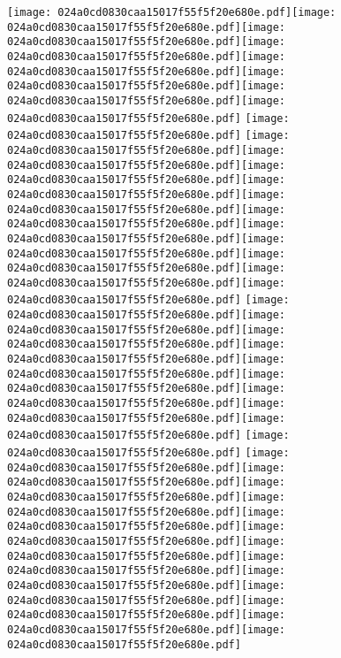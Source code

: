 \documentclass{article}
\newcommand{\origpg}[2]{\texttt{[image: 024a0cd0830caa15017f55f5f20e680e.pdf]}}
\begin{document}
{\vspace{20.015pt}\origpg{13}{85.303pt 625.79pt 93.373pt 641.93pt}\hspace{-0.113pt}\origpg{13}{93.26pt 625.79pt 101.48pt 641.93pt}\origpg{13}{101.48pt 625.79pt 109.55pt 641.93pt}\hspace{-0.387pt}\origpg{13}{109.16pt 625.79pt 117.21pt 641.93pt}\hspace{0.113pt}\origpg{13}{117.33pt 625.79pt 125.4pt 641.93pt}\hspace{-0.597pt}\origpg{13}{124.8pt 625.79pt 132.92pt 641.93pt}\origpg{13}{132.96pt 625.79pt 140.81pt 641.93pt}\origpg{13}{140.91pt 625.79pt 149.54pt 641.93pt} \hspace{20.079pt}\origpg{13}{173.65pt 625.79pt 180.82pt 641.93pt} \hspace{20.046pt}\origpg{13}{204.95pt 625.79pt 213.59pt 641.93pt}\origpg{13}{213.59pt 625.79pt 221.8pt 641.93pt}\origpg{13}{221.8pt 625.79pt 228.97pt 641.93pt}\hspace{-0.161pt}\origpg{13}{228.81pt 625.79pt 237.44pt 641.93pt}\origpg{13}{237.44pt 625.79pt 244.49pt 641.93pt}\origpg{13}{244.49pt 625.79pt 253.13pt 641.93pt}\origpg{13}{253.13pt 625.79pt 261.25pt 641.93pt}\hspace{-0.161pt}\origpg{13}{261.09pt 625.79pt 269.72pt 641.93pt}\origpg{13}{269.72pt 625.79pt 280.57pt 641.93pt}\origpg{13}{280.57pt 625.79pt 290.78pt 641.93pt}\origpg{13}{290.72pt 625.79pt 299.36pt 641.93pt} \hspace{20.272pt}\origpg{13}{323.45pt 625.79pt 331.52pt 641.93pt}\hspace{-0.113pt}\origpg{13}{331.41pt 625.79pt 338.58pt 641.93pt}\origpg{13}{338.62pt 625.79pt 345pt 641.93pt}\hspace{-0.355pt}\origpg{13}{344.65pt 625.79pt 354.86pt 641.93pt}\origpg{13}{354.77pt 625.79pt 361.93pt 641.93pt}\hspace{-0.178pt}\origpg{13}{361.75pt 625.79pt 369.82pt 641.93pt}\origpg{13}{369.92pt 625.79pt 377.09pt 641.93pt}\origpg{13}{377.14pt 625.79pt 387.35pt 641.93pt}\origpg{13}{387.26pt 625.79pt 395.89pt 641.93pt} \hspace{20.321pt}\origpg{13}{420.25pt 625.79pt 428.88pt 641.93pt} \hspace{20.046pt}\origpg{13}{452.75pt 625.79pt 460.37pt 641.93pt}\origpg{13}{460.45pt 625.79pt 467.62pt 641.93pt}\hspace{-0.178pt}\origpg{13}{467.44pt 625.79pt 475.51pt 641.93pt}\origpg{13}{475.61pt 625.79pt 483.68pt 641.93pt}\hspace{-0.355pt}\origpg{13}{483.32pt 625.79pt 490.75pt 641.93pt}\origpg{13}{490.75pt 625.79pt 497.8pt 641.93pt}\origpg{13}{497.8pt 625.79pt 506.44pt 641.93pt}\origpg{13}{506.44pt 625.79pt 514.51pt 641.93pt}\hspace{0.113pt}\origpg{13}{514.62pt 625.79pt 521.78pt 641.93pt}\origpg{13}{521.83pt 625.79pt 528.89pt 641.93pt}\hspace{-0.307pt}\origpg{13}{528.58pt 625.79pt 536pt 641.93pt}\origpg{13}{536pt 625.79pt 546.22pt 641.93pt}\origpg{13}{546.17pt 625.79pt 554.81pt 641.93pt} 

}
\end{document}
